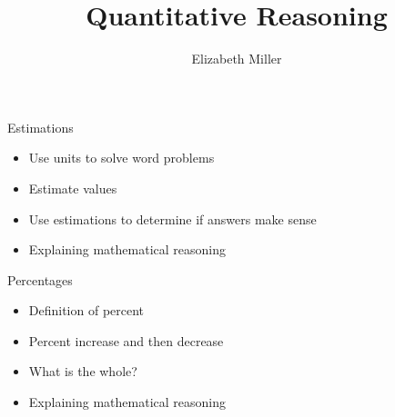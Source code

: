 \documentclass{ximera}
\author{Elizabeth Miller}
\title{Quantitative Reasoning}
\begin{document}
\begin{abstract}
\end{abstract}
\maketitle


\begin{objectives}

\item Estimations
\begin{itemize}
	\item Use units to solve word problems
	\item Estimate values
	\item Use estimations to determine if answers make sense
	\item Explaining mathematical reasoning
\end{itemize}


\item  Percentages
\begin{itemize}
	\item Definition of percent
	\item Percent increase and then decrease
	\item What is the whole?
	\item Explaining mathematical reasoning
\end{itemize}

\end{objectives}
\end{document}
